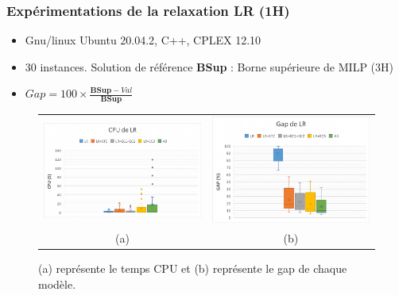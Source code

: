 \documentclass[hyperref={bookmarks=false},aspectratio=169]{beamer}
\begin{document}
\begin{frame}
\frametitle{Expérimentations de la relaxation LR (1H)}%
\begin{itemize}
\item Gnu/linux Ubuntu 20.04.2, C++, CPLEX 12.10
\item 30 instances. Solution de référence \textbf{BSup} : Borne supérieure de MILP (3H)
\item $Gap=100 \times \frac{\textbf{BSup}-Val}{\textbf{BSup}}$
\end{itemize}
\begin{figure}[H]
	\centering
	\begin{tabular}{c c}
		\includegraphics[width=6.5cm]{figures/slide_CPU_RMILP_INST_VAR.pdf}&%
		\includegraphics[width=6.5cm]{figures/slide_GAP_RMILP_INST_VAR.pdf}%
		\\
		(a) & (b)
	\end{tabular}
	\caption{ (a) représente le temps CPU et (b) représente le gap de chaque modèle.}\label{gap_cpu_RMILP_INST_VAR}%
\end{figure}

\end{frame}
\end{document}
